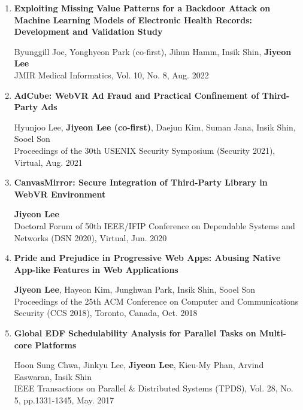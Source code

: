 \documentclass[11pt,letterpaper]{article}
\begin{document}
%
%

\begin{enumerate}
		\item \textbf{Exploiting Missing Value Patterns for a Backdoor Attack on Machine Learning Models of Electronic Health Records: Development and Validation Study} \\
	\begin{small}
		Byunggill Joe, Yonghyeon Park (co-first), Jihun Hamm, Insik Shin, \textbf{Jiyeon Lee} \\ 
JMIR Medical Informatics, Vol. 10, No. 8, Aug. 2022
	\end{small}
	
	\item \textbf{AdCube: WebVR Ad Fraud and Practical Confinement of Third-Party Ads} \\
	\begin{small}
		Hyunjoo Lee, \textbf{Jiyeon Lee (co-first)}, Daejun Kim, Suman Jana, Insik Shin, Sooel Son \\ 
		Proceedings of the 30th USENIX Security Symposium (Security 2021), Virtual, Aug. 2021
	\end{small}

	\item \textbf{CanvasMirror: Secure Integration of Third-Party Library in WebVR Environment} \\
	\begin{small}
		\textbf{Jiyeon Lee}\\ 
		Doctoral Forum of 50th IEEE/IFIP Conference on Dependable Systems and Networks (DSN 2020), Virtual, Jun. 2020
	\end{small}

	\item \textbf{Pride and Prejudice in Progressive Web Apps: Abusing Native App-like Features in Web Applications} \\
	\begin{small}
		\textbf{Jiyeon Lee}, Hayeon Kim, Junghwan Park, Insik Shin, Sooel Son\\ 
		Proceedings of the 25th ACM Conference on Computer and Communications Security (CCS 2018), Toronto, Canada, Oct. 2018
	\end{small}

	\item \textbf{Global EDF Schedulability Analysis for Parallel Tasks on Multi-core Platforms} \\
	\begin{small}
		Hoon Sung Chwa, Jinkyu Lee, \textbf{Jiyeon Lee}, Kieu-My Phan, Arvind Easwaran, Insik Shin\\ 
		IEEE Transactions on Parallel \& Distributed Systems (TPDS), Vol. 28, No. 5, pp.1331-1345, May. 2017
	\end{small}


\end{enumerate}
\end{document}
